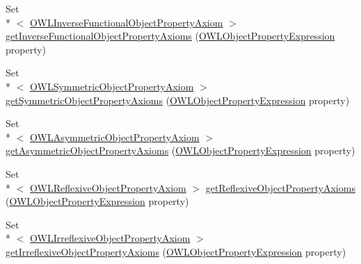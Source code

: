 \begin{DoxyCompactItemize}
\item 
Set\\*
$<$ \hyperlink{interfaceorg_1_1semanticweb_1_1owlapi_1_1model_1_1_o_w_l_inverse_functional_object_property_axiom}{O\-W\-L\-Inverse\-Functional\-Object\-Property\-Axiom} $>$ \hyperlink{interfaceorg_1_1semanticweb_1_1owlapi_1_1model_1_1_o_w_l_ontology_a132e4ade878c481eed71f1e5fc2e6a4f}{get\-Inverse\-Functional\-Object\-Property\-Axioms} (\hyperlink{interfaceorg_1_1semanticweb_1_1owlapi_1_1model_1_1_o_w_l_object_property_expression}{O\-W\-L\-Object\-Property\-Expression} property)
\item 
Set\\*
$<$ \hyperlink{interfaceorg_1_1semanticweb_1_1owlapi_1_1model_1_1_o_w_l_symmetric_object_property_axiom}{O\-W\-L\-Symmetric\-Object\-Property\-Axiom} $>$ \hyperlink{interfaceorg_1_1semanticweb_1_1owlapi_1_1model_1_1_o_w_l_ontology_a7954e2f9926e0aaa55043312b74cbafd}{get\-Symmetric\-Object\-Property\-Axioms} (\hyperlink{interfaceorg_1_1semanticweb_1_1owlapi_1_1model_1_1_o_w_l_object_property_expression}{O\-W\-L\-Object\-Property\-Expression} property)
\item 
Set\\*
$<$ \hyperlink{interfaceorg_1_1semanticweb_1_1owlapi_1_1model_1_1_o_w_l_asymmetric_object_property_axiom}{O\-W\-L\-Asymmetric\-Object\-Property\-Axiom} $>$ \hyperlink{interfaceorg_1_1semanticweb_1_1owlapi_1_1model_1_1_o_w_l_ontology_a5a18e211c8600d6f954fb302cdbd313d}{get\-Asymmetric\-Object\-Property\-Axioms} (\hyperlink{interfaceorg_1_1semanticweb_1_1owlapi_1_1model_1_1_o_w_l_object_property_expression}{O\-W\-L\-Object\-Property\-Expression} property)
\item 
Set\\*
$<$ \hyperlink{interfaceorg_1_1semanticweb_1_1owlapi_1_1model_1_1_o_w_l_reflexive_object_property_axiom}{O\-W\-L\-Reflexive\-Object\-Property\-Axiom} $>$ \hyperlink{interfaceorg_1_1semanticweb_1_1owlapi_1_1model_1_1_o_w_l_ontology_a660ca894c54f21b072bf352941c187f7}{get\-Reflexive\-Object\-Property\-Axioms} (\hyperlink{interfaceorg_1_1semanticweb_1_1owlapi_1_1model_1_1_o_w_l_object_property_expression}{O\-W\-L\-Object\-Property\-Expression} property)
\item 
Set\\*
$<$ \hyperlink{interfaceorg_1_1semanticweb_1_1owlapi_1_1model_1_1_o_w_l_irreflexive_object_property_axiom}{O\-W\-L\-Irreflexive\-Object\-Property\-Axiom} $>$ \hyperlink{interfaceorg_1_1semanticweb_1_1owlapi_1_1model_1_1_o_w_l_ontology_ad30880887287c54e198edab19bd7d85e}{get\-Irreflexive\-Object\-Property\-Axioms} (\hyperlink{interfaceorg_1_1semanticweb_1_1owlapi_1_1model_1_1_o_w_l_object_property_expression}{O\-W\-L\-Object\-Property\-Expression} property)

\end{DoxyCompactItemize}
